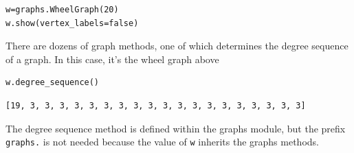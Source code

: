 \documentclass[10pt,]{book}
\theoremstyle{plain}
\theoremstyle{definition}
\theoremstyle{definition}
\theoremstyle{definition}
\theoremstyle{definition}
\theoremstyle{definition}
\numberwithin{equation}{section}
\begin{document}
\begin{lstlisting}[style=sageinput]
w=graphs.WheelGraph(20)
w.show(vertex_labels=false)
\end{lstlisting}
\par
There are dozens of graph methods, one of which determines the degree sequence of a graph.  In this case, it's the wheel graph above %
\begin{lstlisting}[style=sageinput]
w.degree_sequence()
\end{lstlisting}
\begin{lstlisting}[style=sageoutput]
[19, 3, 3, 3, 3, 3, 3, 3, 3, 3, 3, 3, 3, 3, 3, 3, 3, 3, 3, 3]
\end{lstlisting}
\par
The degree sequence method is defined within the graphs module, but the prefix \lstinline?graphs.? is not needed because the value of \lstinline?w? inherits the graphs methods.%
\typeout{************************************************}
\typeout{************************************************}
\end{document}
